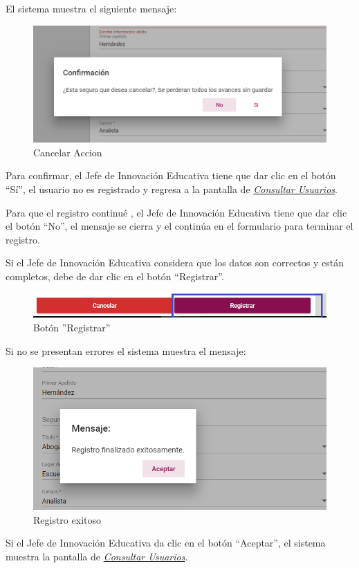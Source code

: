 El sistema muestra el siguiente mensaje:


\begin{figure}[H]
	\centering
	\includegraphics[width=0.4\linewidth]{images/SP5/MSG29}
	\caption{Cancelar Accion}
	\label{mensaje29}
\end{figure}

Para confirmar, el Jefe de Innovación Educativa tiene que dar clic en el botón “Sí”, el usuario no es registrado y regresa a la pantalla de \hyperlink{consultarUs}{\textit{Consultar Usuarios}}.

Para que el registro continué , el Jefe de Innovación Educativa tiene que  dar clic el botón “No”, el mensaje se  cierra  y el continúa en el formulario para terminar el registro.

Si el Jefe de Innovación Educativa considera que los datos son correctos y están completos, debe de dar clic en el botón “Registrar”.

\begin{figure}[H]
	\centering
	\hypertarget{btnreg}{\includegraphics[width=0.7\linewidth]{images/SP5/BtnRegistrar}}
	\caption{Botón ''Registrar''}
	\label{btnreg}
\end{figure}

Si no se presentan errores el sistema muestra el mensaje:


\begin{figure}[H]
	\centering
	\includegraphics[width=0.4\linewidth]{images/SP5/MSG5}
	\caption{Registro exitoso}
	\label{mensaje5}

\end{figure}

Si el Jefe de Innovación Educativa  da clic en el botón “Aceptar”, el sistema muestra la pantalla de  \hyperlink{consultarUs}{\textit{Consultar Usuarios}}.

